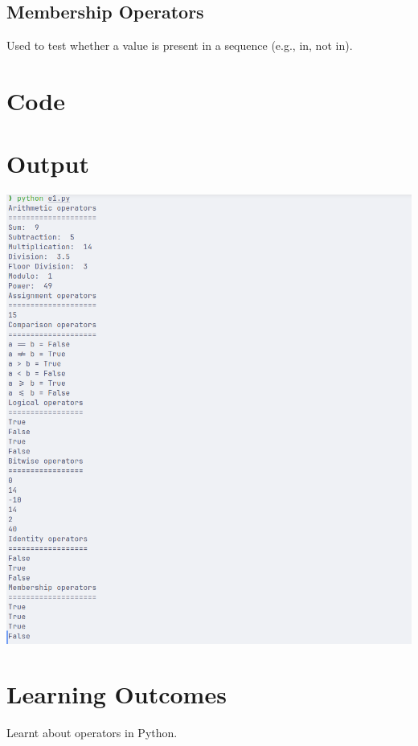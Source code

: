 \documentclass[12pt]{fphw}
\begin{document}
\subsection{Membership Operators}
Used to test whether a value is present in a sequence (e.g., in, not in).

\section{Code}
    
\section{Output}
  \begin{center}
    \includegraphics[width=0.7\columnwidth]{./e1.png}
  \end{center}
\section{Learning Outcomes}
Learnt about operators in Python.
\end{document}
